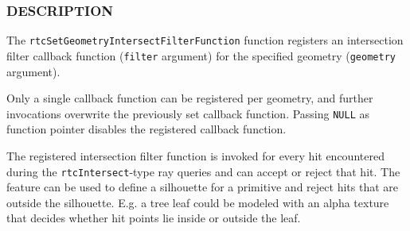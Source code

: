\begin{Shaded}
\begin{Highlighting}[]

\OperatorTok{\{}
  \OperatorTok{*}\OperatorTok{;}
  \OperatorTok{*}\OperatorTok{;}
   \OperatorTok{*}\OperatorTok{;}
  \OperatorTok{*}\OperatorTok{;}
  \OperatorTok{*}\OperatorTok{;}
   \OperatorTok{;}
\OperatorTok{\};}

  \OperatorTok{(*}\OperatorTok{)(}
   \OperatorTok{*}
\OperatorTok{);}

\OperatorTok{(}
\OperatorTok{,}
\OperatorTok{);}
\end{Highlighting}
\end{Shaded}

\subsubsection{DESCRIPTION}\label{description}

The \texttt{rtcSetGeometryIntersectFilterFunction} function registers an
intersection filter callback function (\texttt{filter} argument) for the
specified geometry (\texttt{geometry} argument).

Only a single callback function can be registered per geometry, and
further invocations overwrite the previously set callback function.
Passing \texttt{NULL} as function pointer disables the registered
callback function.

The registered intersection filter function is invoked for every hit
encountered during the \texttt{rtcIntersect}-type ray queries and can
accept or reject that hit. The feature can be used to define a
silhouette for a primitive and reject hits that are outside the
silhouette. E.g. a tree leaf could be modeled with an alpha texture that
decides whether hit points lie inside or outside the leaf.

